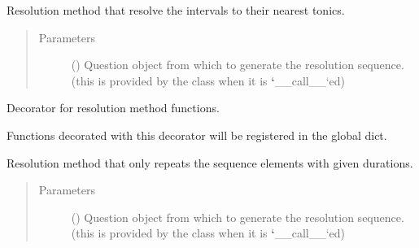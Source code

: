 \documentclass[letterpaper,10pt,english]{sphinxmanual}
\begin{document}

\begin{fulllineitems}
\label{\detokenize{birdears:birdears.resolution.nearest_tonic}}
Resolution method that resolve the intervals to their nearest tonics.
\begin{quote}\begin{description}
\item[{Parameters}] \leavevmode
{} () \textendash{} Question object from which to generate the
resolution sequence. (this is provided by the  class
when it is {\color{red}\bfseries{}{}`}\_\_call\_\_{}`ed)

\end{description}\end{quote}

\end{fulllineitems}


\begin{fulllineitems}
\label{\detokenize{birdears:birdears.resolution.register_resolution_method}}
Decorator for resolution method functions.

Functions decorated with this decorator will be registered in the
 global dict.

\end{fulllineitems}


\begin{fulllineitems}
\label{\detokenize{birdears:birdears.resolution.repeat_only}}
Resolution method that only repeats the sequence elements with given
durations.
\begin{quote}\begin{description}
\item[{Parameters}] \leavevmode
{} () \textendash{} Question object from which to generate the
resolution sequence. (this is provided by the  class
when it is {\color{red}\bfseries{}{}`}\_\_call\_\_{}`ed)

\end{description}\end{quote}

\end{fulllineitems}
\end{document}
